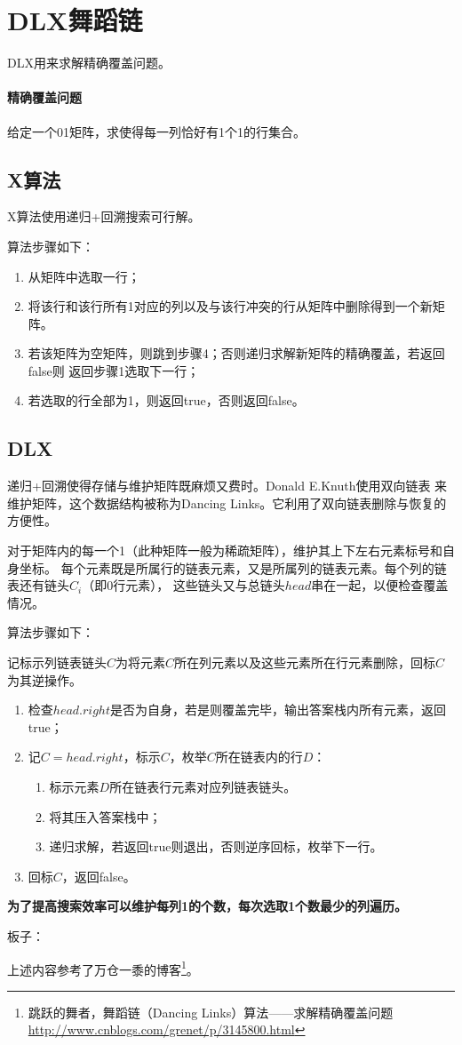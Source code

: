 \section{DLX舞蹈链}
DLX用来求解精确覆盖问题。

\paragraph{精确覆盖问题} 给定一个01矩阵，求使得每一列恰好有1个1的行集合。
\subsection{X算法}
X算法使用递归+回溯搜索可行解。

算法步骤如下：
\begin{enumerate}
	\item 从矩阵中选取一行；
	\item 将该行和该行所有1对应的列以及与该行冲突的行从矩阵中删除得到一个新矩阵。
	\item 若该矩阵为空矩阵，则跳到步骤4；否则递归求解新矩阵的精确覆盖，若返回false则
	      返回步骤1选取下一行；
	\item 若选取的行全部为1，则返回true，否则返回false。
\end{enumerate}
\subsection{DLX}
递归+回溯使得存储与维护矩阵既麻烦又费时。Donald E.Knuth使用双向链表
来维护矩阵，这个数据结构被称为Dancing Links。它利用了双向链表删除与恢复的方便性。

对于矩阵内的每一个1（此种矩阵一般为稀疏矩阵），维护其上下左右元素标号和自身坐标。
每个元素既是所属行的链表元素，又是所属列的链表元素。每个列的链表还有链头$C_i$（即0行元素），
这些链头又与总链头$head$串在一起，以便检查覆盖情况。

算法步骤如下：

记标示列链表链头$C$为将元素$C$所在列元素以及这些元素所在行元素删除，回标$C$为其逆操作。
\begin{enumerate}
	\item 检查$head.right$是否为自身，若是则覆盖完毕，输出答案栈内所有元素，返回true；
	\item 记$C=head.right$，标示$C$，枚举$C$所在链表内的行$D$：
	      \begin{enumerate}
		      \item 标示元素$D$所在链表行元素对应列链表链头。
		      \item 将其压入答案栈中；
		      \item 递归求解，若返回true则退出，否则逆序回标，枚举下一行。
	      \end{enumerate}
	\item 回标$C$，返回false。
\end{enumerate}

{\bfseries 为了提高搜索效率可以维护每列1的个数，每次选取1个数最少的列遍历。}

板子：


上述内容参考了万仓一黍的博客\footnote{
	跳跃的舞者，舞蹈链（Dancing Links）算法——求解精确覆盖问题
	\url{http://www.cnblogs.com/grenet/p/3145800.html}
}。
